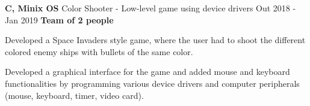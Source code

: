 \cventry
  {\textbf{C, Minix OS}}
  {Color Shooter - Low-level game using device drivers \href{https://github.com/EduRibeiro00/ColorShooter-feup-lcom}{\faExternalLink}} %
  {Out 2018 - Jan 2019}
  {\textbf{Team of 2 people}}
  {
    \begin{cvitems} %
      \item {Developed a Space Invaders style game, where the user had to shoot the different colored enemy ships with bullets of the same color.}
      \item {Developed a graphical interface for the game and added mouse and keyboard functionalities by programming various device drivers and computer peripherals (mouse, keyboard, timer, video card).}
    \end{cvitems}
  }